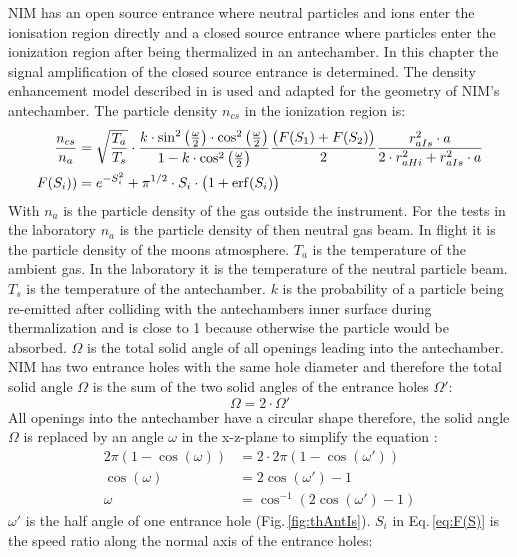 		NIM has an open source entrance where neutral particles and ions enter the ionisation region directly and a closed source entrance where particles enter the ionization region after being thermalized in an antechamber. In this chapter the signal amplification of the closed source entrance is determined. The density enhancement model described in \cite{DensEnhan_Wurz_07} is used and adapted for the geometry of NIM's antechamber. The particle density $n_{cs}$ in the ionization region is:
		\begin{align}
			\frac{n_{cs}}{n_a} &= \sqrt{\frac{T_a}{T_s}}\cdot\frac{k\cdot \sin^2\big(\frac{\omega}{2}\big)\cdot \cos^2\big(\frac{\omega}{2}\big)}{1-k\cdot \cos^2\big(\frac{\omega}{2}\big)}\frac{\big(F(S_1)+ F(S_2)\big)}{2} \frac{r_{aIs}^2\cdot a}{2\cdot r_{aHi}^2 + r_{aIs}^2\cdot a} \label{eq:thDensEnhan}\\
			F(S_i)) &= e^{-S_i^2} + \pi^{1/2}\cdot S_i\cdot\big(1 + {\rm erf}(S_i)\big) \label{eq:F(S)}
		\end{align}
		With $n_a$ is the particle density of the gas outside the instrument. For the tests in the laboratory $n_a$ is the particle density of then neutral gas beam. In flight it is the particle density of the moons atmosphere. $T_a$ is the temperature of the ambient gas. In the laboratory it is the temperature of the neutral particle beam. $T_s$ is the temperature of the antechamber. $k$ is the probability of a particle being re-emitted after colliding with the antechambers inner surface during thermalization and is close to 1 because otherwise the particle would be absorbed. $\Omega$ is the total solid angle of all openings leading into the antechamber. NIM has two entrance holes with the same hole diameter and therefore the total solid angle $\Omega$ is the sum of the two solid angles of the entrance holes $\Omega'$:
		\begin{equation}
			\Omega = 2\cdot\Omega'
		\end{equation}
		All openings into the antechamber have a circular shape therefore, the solid angle $\Omega$ is replaced by an angle $\omega$ in the x-z-plane to simplify the equation \cite{Hedin_1964}: 
		\begin{align}
			2\pi(1- \cos(\omega)) &= 2\cdot 2\pi(1- \cos(\omega'))\\
			\cos(\omega) &= 2\cos(\omega') -1\\
			\omega &= \cos^{-1}(2\cos(\omega') -1)
		\end{align}
		$\omega'$ is the half angle of one entrance hole (Fig.\,\ref{fig:thAntIs}). $S_i$ in Eq.\,\eqref{eq:F(S)} is the speed ratio along the normal axis of the entrance holes:
